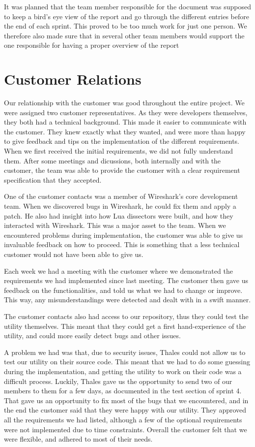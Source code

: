 It was planned that the team member responsible for the document was supposed to keep a bird's eye view of the report and go through the different entries before the end of each sprint. This proved to be too much work for just one person. We therefore also made sure that in several other team members would support the one responsible for having a proper overview of the report 

\section{Customer Relations}
Our relationship with the customer was good throughout the entire project.
We were assigned two customer representatives. As they were developers themselves, they both had a technical background. This made it easier to communicate with the customer.
They knew exactly what they wanted, and were more than happy to give feedback and tips on the implementation of the different requirements. When we first received the initial requirements, we did not fully understand them. After some meetings and dicussions, both internally and with the customer, the team was able to provide the customer with a clear requirement specification that they accepted.

One of the customer contacts was a member of Wireshark's core development team. When we discovered bugs in Wireshark, he could fix them and apply a patch. He also had insight into how 
Lua dissectors were built, and how they interacted with Wireshark. This was a major asset to the team. When we encountered problems during implementation, the customer was able to give us invaluable feedback on how to proceed. This is something that a less technical customer would not have been able to give us.

Each week we had a meeting with the customer where we demonstrated the requirements we had implemented since last meeting. The customer then gave us feedback on the functionalities, and told us what we had to change or improve. This way, any misunderstandings were detected and dealt with in a swift manner.

The customer contacts also had access to our repository, thus they could test the utility themselves.
This meant that they could get a first hand-experience of the utility, and could more easily detect bugs and other issues.	

A problem we had was that, due to security issues, Thales could not allow us to test our utility on their source code. This meant that we had to do some guessing during the implementation, and getting the utility to work on their code was a difficult process. Luckily, Thales gave us the opportunity to send two of our members to them for a few days, as documented in the test section of sprint 4. That gave us an opportunity to fix most of the bugs that we encountered, and in the end the customer said that they were happy with our utility. They approved all the requirements we had listed, although a few of the optional requirements were not implemented due to time constraints.
Overall the customer felt that we were flexible, and adhered to most of their needs.

